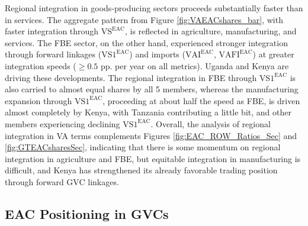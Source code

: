 \documentclass[a4paper]{article}
\begin{document}
Regional integration in goods-producing sectors proceeds substantially faster than in services. The aggregate pattern from Figure \ref{fig:VAEACshares_bar}, with faster integration through $\text{VS}^\text{EAC}$, is reflected in agriculture, manufacturing, and services. The FBE sector, on the other hand, experienced stronger integration through forward linkages ($\text{VS1}^\text{EAC}$) and imports ($\text{VAI}^\text{EAC}$, $\text{VAFI}^\text{EAC}$) at greater integration speeds ($\geq 0.5$ pp. per year on all metrics). Uganda and Kenya are driving these developments. The regional integration in FBE through $\text{VS1}^\text{EAC}$ is also carried to almost equal shares by all 5 members, whereas the manufacturing expansion through $\text{VS1}^\text{EAC}$, proceeding at about half the speed as FBE, is driven almost completely by Kenya, with Tanzania contributing a little bit, and other members experiencing declining $\text{VS1}^\text{EAC}$. Overall, the analysis of regional integration in VA terms complements Figures \ref{fig:EAC_ROW_Ratios_Sec} and \ref{fig:GTEACsharesSec}, indicating that there is some momentum on regional integration in agriculture and FBE, but equitable integration in manufacturing is difficult, and Kenya has strengthened its already favorable trading position through forward GVC linkages. 


\subsection{EAC Positioning in GVCs}
\end{document}
